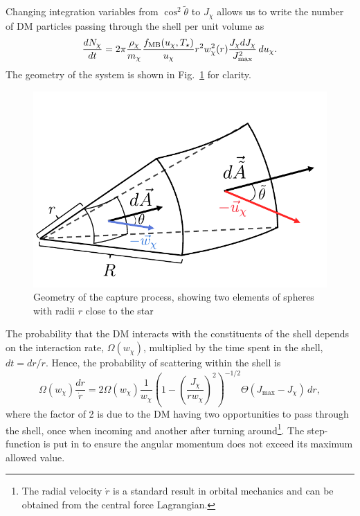 Changing integration variables from $\cos^2\tilde \theta$ to $J_\chi$ allows us to write the number of DM particles passing through the shell per unit volume as
\begin{equation}
    \frac{dN_\chi}{dt} = 2\pi \frac{\rho_\chi}{m_\chi} \frac{f_{\rm MB}(u_\chi, T_\star)}{u_\chi} r^2 w_\chi^2(r) \frac{J_\chi dJ_\chi}{J^2_\mathrm{max}}\,du_\chi.\label{ch3:eq:shell_flux}
\end{equation}
The geometry of the system is shown in Fig.~\ref{ch3:fig:capturegeometry} for clarity.

\begin{figure}
    \centering
    \includegraphics{capture_geometry.pdf}
    \caption{Geometry of the capture process, showing two elements of spheres with radii $r$ close to the star  }
    \label{ch3:fig:capturegeometry}
\end{figure}

The probability that the DM interacts with the constituents of the shell depends on the interaction rate, $\Omega(w_\chi)$, multiplied by the time spent in the shell, $dt = dr/\dot r$. Hence, the probability of scattering within the shell is
\begin{equation}
    \Omega(w_\chi) \frac{dr}{\dot r} = 2  \Omega(w_\chi)\frac{1}{w_\chi}\left(1 - \left(\frac{J_\chi}{r w_\chi}\right)^2 \right)^{-1/2} \Theta(J_{\mathrm{max}} - J_\chi)\,dr,\label{ch3:eq:int_prob_1}
\end{equation}
where the factor of 2 is due to the DM having two opportunities to pass through the shell, once when incoming and another after turning around\footnote{The radial velocity $\dot r$ is a standard result in orbital mechanics and can be obtained from the central force Lagrangian.}. The step-function is put in to ensure the angular momentum does not exceed its maximum allowed value. 

